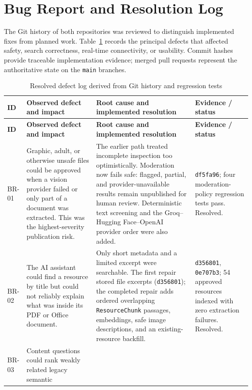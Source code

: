 \documentclass[12pt,a4paper]{report}
\begin{document}
\section{Bug Report and Resolution Log}
The Git history of both repositories was reviewed to distinguish
implemented fixes from planned work. Table~\ref{tab:buglog} records
the principal defects that affected safety, search correctness,
real-time connectivity, or usability. Commit hashes provide
traceable implementation evidence; merged pull requests represent
the authoritative state on the \texttt{main} branches.

\begin{longtable}{@{}>{\raggedright\arraybackslash}p{1.15cm}
  >{\raggedright\arraybackslash}p{4.15cm}
  >{\raggedright\arraybackslash}p{5.15cm}
  >{\raggedright\arraybackslash}p{3.1cm}@{}}
\caption{Resolved defect log derived from Git history and regression tests}
\label{tab:buglog}\\
\toprule
\textbf{ID} & \textbf{Observed defect and impact} &
\textbf{Root cause and implemented resolution} &
\textbf{Evidence / status} \\
\midrule
\endfirsthead
\toprule
\textbf{ID} & \textbf{Observed defect and impact} &
\textbf{Root cause and implemented resolution} &
\textbf{Evidence / status} \\
\midrule
\endhead
BR-01 & Graphic, adult, or otherwise unsafe files could be approved
when a vision provider failed or only part of a document was
extracted. This was the highest-severity publication risk. &
The earlier path treated incomplete inspection too optimistically.
Moderation now fails safe: flagged, partial, and provider-unavailable
results remain unpublished for human review. Deterministic text
screening and the Groq--Hugging Face--OpenAI provider order were also
added. & \texttt{df5fa96}; four moderation-policy regression tests
pass. Resolved. \\
\addlinespace
BR-02 & The AI assistant could find a resource by title but could not
reliably explain what was inside its PDF or Office document. &
Only short metadata and a limited excerpt were searchable. The first
repair stored file excerpts (\texttt{d356801}); the completed repair
adds ordered overlapping \texttt{ResourceChunk} passages, embeddings,
safe image descriptions, and an existing-resource backfill. &
\texttt{d356801}, \texttt{0e707b3}; 54 approved resources indexed
with zero extraction failures. Resolved. \\
\addlinespace
BR-03 & Content questions could rank weakly related legacy semantic

\end{longtable}
\end{document}
